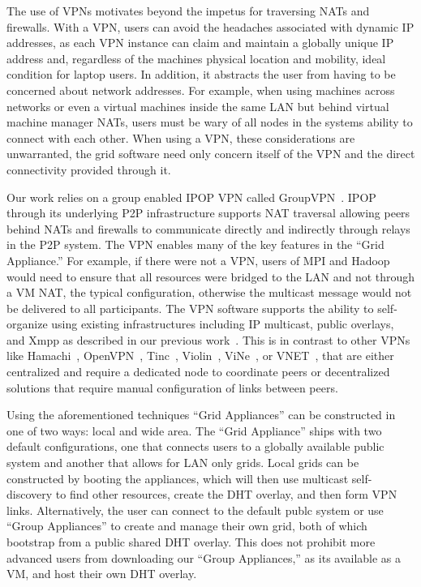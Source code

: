\documentclass[conference]{IEEEtran}
\begin{document}
The use of VPNs motivates beyond the impetus for traversing NATs and firewalls.
With a VPN, users can avoid the headaches associated with dynamic IP addresses,
as each VPN instance can claim and maintain a globally unique IP address and,
regardless of the machines physical location and mobility, ideal condition for
laptop users.  In addition, it abstracts the user from having to be concerned
about network addresses.  For example, when using machines across networks or
even a virtual machines inside the same LAN but behind virtual machine manager
NATs, users must be wary of all nodes in the systems ability to connect with
each other.  When using a VPN, these considerations are unwarranted, the grid
software need only concern itself of the VPN and the direct connectivity
provided through it.

Our work relies on a group enabled IPOP VPN called GroupVPN~\cite{groupvpn}.
IPOP through its underlying P2P infrastructure supports NAT traversal allowing
peers behind NATs and firewalls to communicate directly and indirectly through
relays in the P2P system.  The VPN enables many of the key features in the
``Grid Appliance.'' For example, if there were not a VPN, users of MPI and
Hadoop would need to ensure that all resources were bridged to the LAN and not
through a VM NAT, the typical configuration, otherwise the multicast message
would not be delivered to all participants.  The VPN software supports the
ability to self-organize using existing infrastructures including IP multicast,
public overlays, and Xmpp as described in our previous work~\cite{p2p10}.  This
is in contrast to other VPNs like Hamachi~\cite{hamachi},
OpenVPN~\cite{openvpn}, Tinc~\cite{tinc}, Violin~\cite{violin},
ViNe~\cite{vine}, or VNET~\cite{vnet}, that are either centralized and require
a dedicated node to coordinate peers or decentralized solutions that require
manual configuration of links between peers.

Using the aforementioned techniques ``Grid Appliances'' can be constructed in
one of two ways: local and wide area.  The ``Grid Appliance'' ships with two
default configurations, one that connects users to a globally available public
system and another that allows for LAN only grids.  Local grids can be
constructed by booting the appliances, which will then use multicast
self-discovery to find other resources, create the DHT overlay, and then form
VPN links.  Alternatively, the user can connect to the default publc system or
use ``Group Appliances'' to create and manage their own grid, both of which
bootstrap from a public shared DHT overlay.  This does not prohibit more
advanced users from downloading our ``Group Appliances,'' as its available as a
VM, and host their own DHT overlay.
\end{document}
